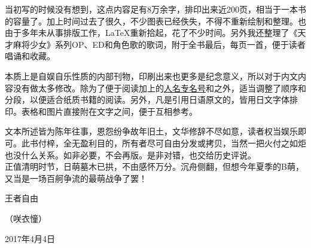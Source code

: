 当初写的时候没有想到，这点内容足有8万余字，排印出来近200页，相当于一本书的容量了。加上时间过去了很久，不少图表已经佚失，不得不重新绘制和整理。也由于多年未从事排版工作，\LaTeX 重新拾起，花了不少时间。另外我还整理了《天才麻将少女》系列OP、ED和角色歌的歌词，附于全书最后，每页一首，便于读者唱诵和收藏。

本质上是自娱自乐性质的内部刊物，印刷出来也更多是纪念意义，所以对于内文内容没有做太多修改。除为了便于阅读加上的\uline{人名专名号}和之外，适当调整了顺序和分段，以便适合纸质书籍的阅读。另外，凡是引用日语原文的，皆用日文字体排印。表格和图片直接附在文字之间，便于互相参考。

文本所述皆为陈年往事，恩怨纷争故年旧土，文华修辞不尽如意，读者权当娱乐即可。此书付梓，全无盈利目的，所有者尽可自由分发或拷贝，当然一把火付之如炬也没什么关系。如非必要，不会再版。是非对错，也交给历史评说。
\\

正值清明时节，日萌墓木已拱，不由感怀万分。沉舟侧翻，但想今年夏季的B萌，又当是一场百舸争流的最萌战争了罢！

\begin{flushright}
  \rm\kasho 王者自由

  （咲衣憧）

  \kai 2017年4月4日
\end{flushright}
